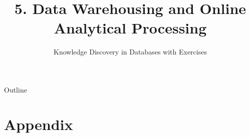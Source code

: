 \documentclass[aspectratio=169,t,table]{beamer}
\title[KDDmUe~5.~OLAP]{5. Data Warehousing and Online Analytical Processing} %
\subtitle{Knowledge Discovery in Databases with Exercises}
\begin{document}
\maketitle

{ %
	\begin{frame}[noframenumbering]{Outline}
		\tableofcontents

	\end{frame}
}







\section{Appendix}
\appendix


\end{document}

